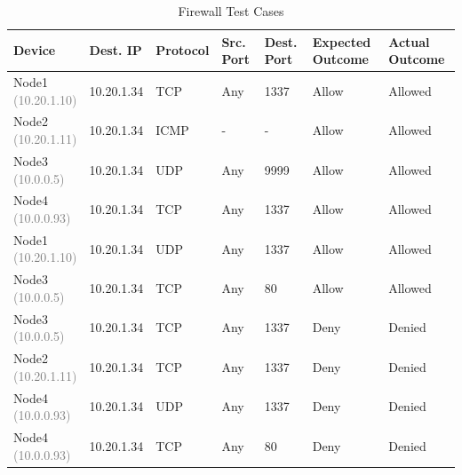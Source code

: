 \begin{table}[h]
    \centering
    \begin{tabular}{m{2.25cm}m{2cm}m{1.5cm}m{2cm}m{2cm}m{2cm}m{2cm}}
        \toprule
        Device & Dest. IP & Protocol & Src. Port & Dest. Port & Expected Outcome & Actual Outcome \\
        \midrule
        \parbox[c]{2.25cm}{\centering Node1\\\textcolor{gray}{(10.20.1.10)} \vspace*{14pt}} & 10.20.1.34 & TCP & Any & 1337 & Allow & Allowed \\
        \parbox[c]{2.25cm}{\centering Node2\\\textcolor{gray}{(10.20.1.11)} \vspace*{14pt}} & 10.20.1.34 & ICMP & - & - & Allow & Allowed \\
        \parbox[c]{2.25cm}{\centering Node3\\\textcolor{gray}{(10.0.0.5)} \vspace*{14pt}} & 10.20.1.34 & UDP & Any & 9999 & Allow & Allowed \\
        \parbox[c]{2.25cm}{\centering Node4\\\textcolor{gray}{(10.0.0.93)} \vspace*{14pt}} & 10.20.1.34 & TCP & Any & 1337 & Allow & Allowed \\
        \parbox[c]{2.25cm}{\centering Node1\\\textcolor{gray}{(10.20.1.10)} \vspace*{14pt}} & 10.20.1.34 & UDP & Any & 1337 & Allow & Allowed \\
        \parbox[c]{2.25cm}{\centering Node3\\\textcolor{gray}{(10.0.0.5)} \vspace*{14pt}} & 10.20.1.34 & TCP & Any & 80 & Allow & Allowed \\
        \parbox[c]{2.25cm}{\centering Node3\\\textcolor{gray}{(10.0.0.5)} \vspace*{14pt}} & 10.20.1.34 & TCP & Any & 1337 & Deny & Denied \\
        \parbox[c]{2.25cm}{\centering Node2\\\textcolor{gray}{(10.20.1.11)} \vspace*{14pt}} & 10.20.1.34 & TCP & Any & 1337 & Deny & Denied \\
        \parbox[c]{2.25cm}{\centering Node4\\\textcolor{gray}{(10.0.0.93)} \vspace*{14pt}} & 10.20.1.34 & UDP & Any & 1337 & Deny & Denied \\
        \parbox[c]{2.25cm}{\centering Node4\\\textcolor{gray}{(10.0.0.93)} \vspace*{14pt}} & 10.20.1.34 & TCP & Any & 80 & Deny & Denied \\
        \bottomrule
    \end{tabular}
    \caption{Firewall Test Cases}
    \label{tab:firewall_test_cases}
\end{table}





